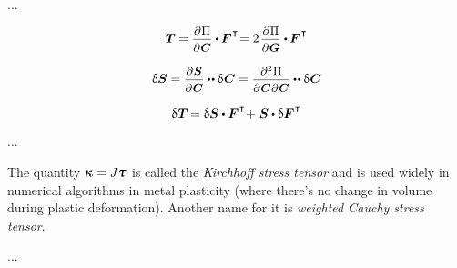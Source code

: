 \begin{otherlanguage}{russian}
...

\begin{equation*}
\firstpiolakirchhoffstress \hspace{-0.1ex}
= \scalebox{0.92}{$ \displaystyle \frac{\partial \hspace{.1ex} \potential}{\raisemath{-0.1em}{\partial \hspace{.1ex} \bm{C}}} $} \dotp \hspace{-0.1ex} \bm{F}^{\hspace{.1ex}\T} \hspace{-0.5ex}
= 2 \hspace{.25ex} \scalebox{0.92}{$ \displaystyle \frac{\partial \hspace{.1ex} \potential}{\raisemath{-0.1em}{\partial \hspace{.1ex} \bm{G}}} $} \dotp \hspace{-0.1ex} \bm{F}^{\hspace{.1ex}\T}
\end{equation*}

\begin{equation*}
\variation{\secondpiolakirchhoffstress}
= \scalebox{0.92}{$ \displaystyle \frac{\partial \hspace{.1ex} \bm{S}}{\raisemath{-0.1em}{\partial \hspace{.1ex} \bm{C}}} $} \dotdotp \variation{\hspace{.12ex}\bm{C}}
= \scalebox{0.92}{$ \displaystyle \frac{\partial^2 \hspace{0.1ex} \potential}{\raisemath{-0.1em}{\partial \hspace{0.1ex} \bm{C} \hspace{0.1ex} \partial \hspace{0.1ex} \bm{C}}} $} \dotdotp \variation{\hspace{.12ex}\bm{C}}
\end{equation*}

\begin{equation*}
\variation{\hspace{.1ex}\firstpiolakirchhoffstress} \hspace{-0.2ex} =
\variation{\secondpiolakirchhoffstress} \dotp \bm{F}^{\hspace{.1ex}\T} \hspace{-0.4ex} + \hspace{.1ex}
\secondpiolakirchhoffstress \dotp \variation{\bm{F}}^{\hspace{.1ex}\T}
\end{equation*}

...

{\small
The quantity ${\bm{\kappa} = J \cauchystress}$ is called the \emph{Kirchhoff stress tensor} and is used widely in numerical algorithms in metal plasticity (where there’s no change in volume during plastic deformation).
Another name for it is \emph{weighted Cauchy stress tensor}.
\par}

...

\end{otherlanguage}

